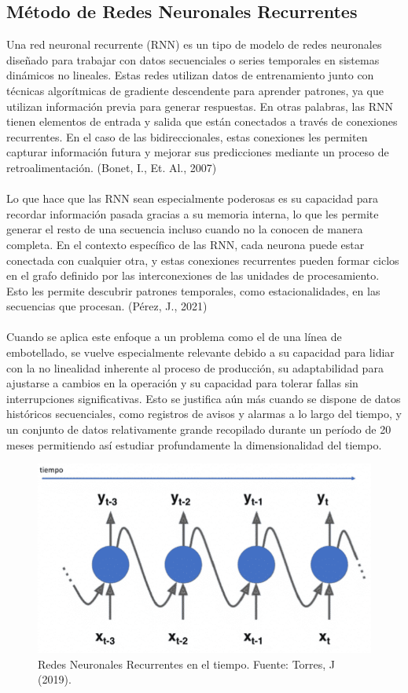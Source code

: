 \documentclass[10pt]{article}
\begin{document}
\subsection{Método de Redes Neuronales Recurrentes}
Una red neuronal recurrente (RNN) es un tipo de modelo de redes neuronales diseñado para trabajar con datos secuenciales o series temporales en sistemas dinámicos no lineales. Estas redes utilizan datos de entrenamiento junto con técnicas algorítmicas de gradiente descendente para aprender patrones, ya que utilizan información previa para generar respuestas. En otras palabras, las RNN tienen elementos de entrada y salida que están conectados a través de conexiones recurrentes. En el caso de las bidireccionales, estas conexiones les permiten capturar información futura y mejorar sus predicciones mediante un proceso de retroalimentación. (Bonet, I., Et. Al., 2007) \\
\\
Lo que hace que las RNN sean especialmente poderosas es su capacidad para recordar información pasada gracias a su memoria interna, lo que les permite generar el resto de una secuencia incluso cuando no la conocen de manera completa. En el contexto específico de las RNN, cada neurona puede estar conectada con cualquier otra, y estas conexiones recurrentes pueden formar ciclos en el grafo definido por las interconexiones de las unidades de procesamiento. Esto les permite descubrir patrones temporales, como estacionalidades, en las secuencias que procesan. (Pérez, J., 2021) \\
\\
Cuando se aplica este enfoque a un problema como el de una línea de embotellado, se vuelve especialmente relevante debido a su capacidad para lidiar con la no linealidad inherente al proceso de producción, su adaptabilidad para ajustarse a cambios en la operación y su capacidad para tolerar fallas sin interrupciones significativas. Esto se justifica aún más cuando se dispone de datos históricos secuenciales, como registros de avisos y alarmas a lo largo del tiempo, y un conjunto de datos relativamente grande recopilado durante un período de 20 meses permitiendo así estudiar profundamente la dimensionalidad del tiempo. \\
\begin{figure}[h!]
    \centering
    \includegraphics[scale=0.7]{RNN.PNG}  %
    \caption{Redes Neuronales Recurrentes en el tiempo. Fuente: Torres, J (2019).}           %
\end{figure}\\
\end{document}
